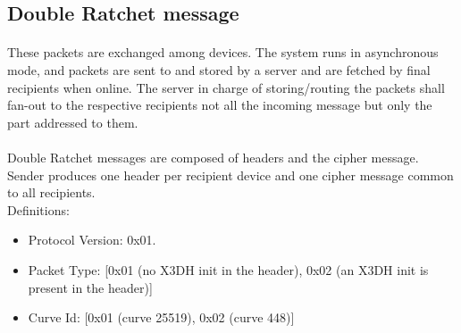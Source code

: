 \documentclass[a4paper,11pt]{article}
\begin{document}
  \subsection{Double Ratchet message}
    \label{subsec:protocol_doubleratchet}
    \paragraph*{}These packets are exchanged among devices. The system runs in asynchronous mode, and packets are sent to and stored by a server and are fetched by final recipients when online. The server in charge of storing/routing the packets shall fan-out to the respective recipients not all the incoming message but only the part addressed to them.

    \paragraph*{}Double Ratchet messages are composed of headers and the cipher message. Sender produces one header per recipient device and one cipher message common to all recipients.\\
      Definitions:
      \begin{itemize}
      \item Protocol Version: 0x01.
      \item Packet Type: [0x01 (no X3DH init in the header), 0x02 (an X3DH init is present in the header)]
      \item Curve Id: [0x01 (curve 25519), 0x02 (curve 448)]
      \end{itemize}
\end{document}

